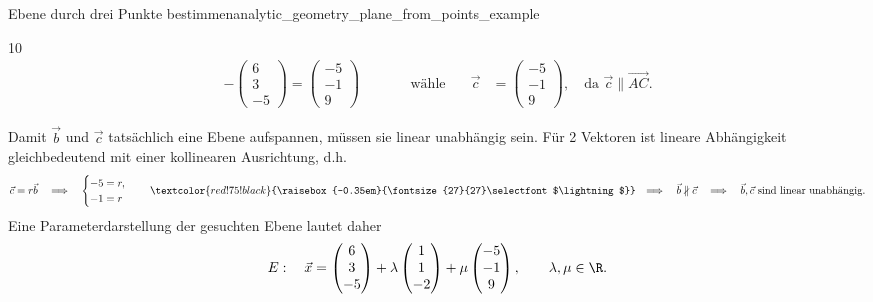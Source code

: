 \begin{ExampleBox}{Ebene durch drei Punkte bestimmen}{analytic_geometry_plane_from_points_example}
{\begin{ClozeArea}[34]{10}
\[\begin{alignedat}{3}
              -\begin{pmatrix}6\\3\\-5\end{pmatrix}
              =\begin{pmatrix}-5\\-1\\9\end{pmatrix}
            &\qquad&\text{wähle}\quad
            &\vec c&=\begin{pmatrix}-5\\-1\\9\end{pmatrix},
              \quad \text{da } \vec c\parallel\overrightarrow{AC}.
        \end{alignedat}
      \]
    \end{ClozeArea}
    Damit $\vec b$ und $\vec c$ tatsächlich eine Ebene aufspannen, müssen sie
    linear unabhängig sein. Für 2 Vektoren ist lineare
    Abhängigkeit gleichbedeutend mit einer kollinearen Ausrichtung, d.h.  \[
      \vec c=r\vec b
      \quad\Longrightarrow\quad
      \begin{cases}
        -5=r,\\
        -1=r
      \end{cases}
      \quad
      \mathrel{\textcolor{red!75!black}{%
        \raisebox{-0.35em}{\fontsize{27}{27}\selectfont $\lightning$}}}
      \quad\Longrightarrow\quad
      \vec b\nparallel\vec c
      \quad\Longrightarrow\quad
      \vec b,\vec c\ \text{sind linear unabhängig}.
    \]
    Eine Parameterdarstellung der gesuchten Ebene lautet daher
    \[
      E:\quad
      \vec x
      =\begin{pmatrix}6\\3\\-5\end{pmatrix}
      +\lambda\begin{pmatrix}1\\1\\-2\end{pmatrix}
      +\mu\begin{pmatrix}-5\\-1\\9\end{pmatrix},
      \qquad \lambda,\mu\in\R.
    \]
  }%
\end{ExampleBox}
